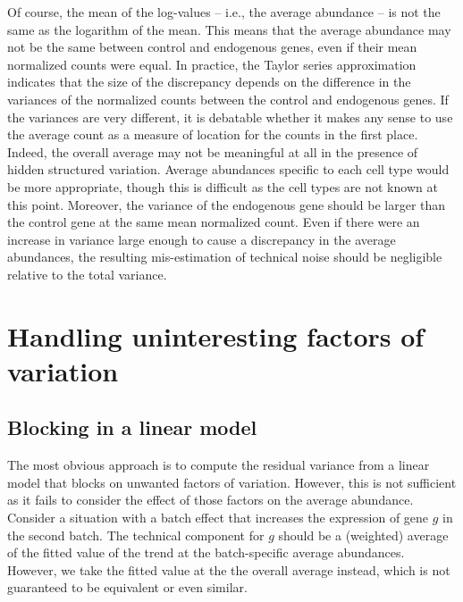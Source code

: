 \documentclass{article}
\begin{document}
Of course, the mean of the log-values -- i.e., the average abundance -- is not the same as the logarithm of the mean.
This means that the average abundance may not be the same between control and endogenous genes, even if their mean normalized counts were equal.
In practice, the Taylor series approximation indicates that the size of the discrepancy depends on the difference in the variances of the normalized counts between the control and endogenous genes.
If the variances are very different, it is debatable whether it makes any sense to use the average count as a measure of location for the counts in the first place.
Indeed, the overall average may not be meaningful at all in the presence of hidden structured variation.
Average abundances specific to each cell type would be more appropriate, though this is difficult as the cell types are not known at this point.
Moreover, the variance of the endogenous gene should be larger than the control gene at the same mean normalized count.
Even if there were an increase in variance large enough to cause a discrepancy in the average abundances,
the resulting mis-estimation of technical noise should be negligible relative to the total variance.


\section{Handling uninteresting factors of variation}

\subsection{Blocking in a linear model}
The most obvious approach is to compute the residual variance from a linear model that blocks on unwanted factors of variation.
However, this is not sufficient as it fails to consider the effect of those factors on the average abundance.
Consider a situation with a batch effect that increases the expression of gene $g$ in the second batch.
The technical component for $g$ should be a (weighted) average of the fitted value of the trend at the batch-specific average abundances.
However, we take the fitted value at the the overall average instead, which is not guaranteed to be equivalent or even similar.
\end{document}
